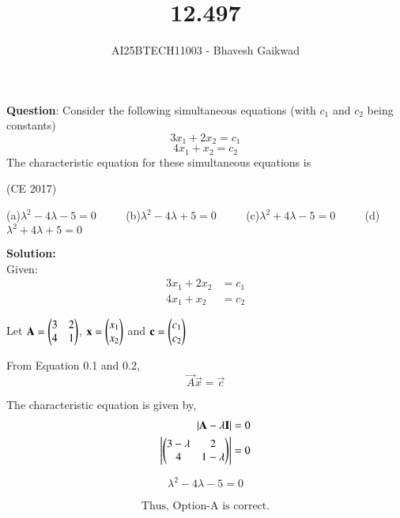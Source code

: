 \documentclass[journal]{IEEEtran}
\begin{document}

\vspace{3cm}

\title{12.497}
\author{AI25BTECH11003 - Bhavesh Gaikwad}
{\let\newpage\relax\maketitle}

\renewcommand{\thefigure}{\theenumi}
\renewcommand{\thetable}{\theenumi}
\setlength{\intextsep}{10pt} 

\renewcommand{\thetable}{\theenumi}


\textbf{Question}: Consider the following simultaneous equations (with $c_1$ and $c_2$ being constants)
$$3x_1 + 2x_2 = c_1$$
$$4x_1 + x_2 = c_2$$
The characteristic equation for these simultaneous equations is

\hfill{(CE 2017)}

(a)$\lambda^2 - 4\lambda - 5 =0$ $\qquad$ (b)$\lambda^2 - 4\lambda + 5 =0$ $\qquad$ (c)$\lambda^2 + 4\lambda - 5 =0$ $\qquad$ (d)$\lambda^2 + 4\lambda + 5 =0$
\bigskip
 
\textbf{Solution:}\\
Given:
\begin{align}
   3x_1 + 2x_2 &= c_1\\
4x_1 + x_2 &= c_2 
\end{align}

Let $\mathbf{A} = \begin{pmatrix}3 & 2 \\ 4 & 1\end{pmatrix}$, $\mathbf{x} = \begin{pmatrix}x_1 \\ x_2\end{pmatrix}$
and $\mathbf{c} = \begin{pmatrix}c_1 \\ c_2\end{pmatrix}$

From Equation 0.1 and 0.2,
\begin{equation}
    \vec{A}\vec{x} = \vec{c}
\end{equation}

The characteristic equation is given by,
\begin{align}
|\mathbf{A} - \lambda\mathbf{I}| &= 0 \\
\left| \begin{pmatrix}3-\lambda & 2 \\ 4 & 1-\lambda\end{pmatrix} \right| &= 0 \\
\end{align}

\begin{equation}
    \boxed{\lambda^2 - 4\lambda - 5 =0}
\end{equation}

\begin{align*}
    \boxed{\text{Thus, Option-A is correct.}}
\end{align*}
\end{document}
